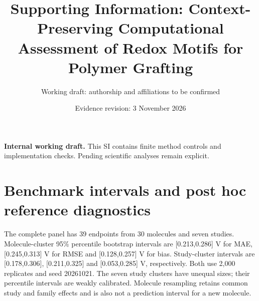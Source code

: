 \documentclass[11pt]{article}
\title{Supporting Information: Context-Preserving Computational Assessment of Redox Motifs for Polymer Grafting}
\author{Working draft: authorship and affiliations to be confirmed}
\date{Evidence revision: 3 November 2026}
\begin{document}
\maketitle
\noindent\textbf{Internal working draft.} This SI contains finite method controls and implementation checks. Pending scientific analyses remain explicit.
\section{Benchmark intervals and post hoc reference diagnostics}
The complete panel has 39 endpoints from 30 molecules and seven studies. Molecule-cluster 95\% percentile bootstrap intervals are [0.213,0.286] V for MAE, [0.245,0.313] V for RMSE and [0.128,0.257] V for bias. Study-cluster intervals are [0.178,0.306], [0.211,0.325] and [0.053,0.285] V, respectively. Both use 2,000 replicates and seed 20261021. The seven study clusters have unequal sizes; their percentile intervals are weakly calibrated. Molecule resampling retains common study and family effects and is also not a prediction interval for a new molecule.
\end{document}
